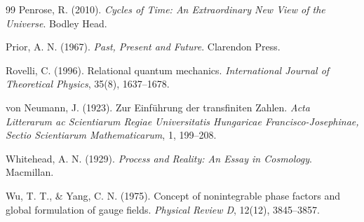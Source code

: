 \documentclass[11pt,a4paper]{article}
\begin{document}
\begin{thebibliography}{99}
Penrose, R. (2010). \emph{Cycles of Time: An Extraordinary New View of the Universe}. Bodley Head.

Prior, A. N. (1967). \emph{Past, Present and Future}. Clarendon Press.

Rovelli, C. (1996). Relational quantum mechanics. \emph{International Journal of Theoretical Physics}, 35(8), 1637--1678.

von Neumann, J. (1923). Zur Einführung der transfiniten Zahlen. \emph{Acta Litterarum ac Scientiarum Regiae Universitatis Hungaricae Francisco-Josephinae, Sectio Scientiarum Mathematicarum}, 1, 199--208.

Whitehead, A. N. (1929). \emph{Process and Reality: An Essay in Cosmology}. Macmillan.

Wu, T. T., \& Yang, C. N. (1975). Concept of nonintegrable phase factors and global formulation of gauge fields. \emph{Physical Review D}, 12(12), 3845--3857.

\end{thebibliography}
\end{document}
